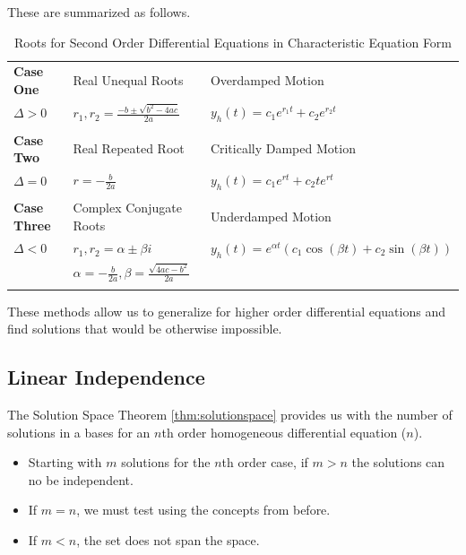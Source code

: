     These are summarized as follows.

        \begin{table}[ht]
            \centering
            \begin{tabular}{| l | l | l |}
                \hline
                \textbf{Case One} & Real Unequal Roots & Overdamped Motion\\
                $\Delta > 0$ & $r_1, r_2 = \frac{-b \pm \sqrt{b^2 - 4ac}}{2a}$ & $y_h(t) = c_1 e^{r_1 t} + c_2 e^{r_2 t}$\\&&\\
                \hline
                \textbf{Case Two} & Real Repeated Root & Critically Damped Motion\\
                $\Delta = 0$ & $r = - \frac{b}{2a} $ & $y_h(t) = c_1 e^{r t} + c_2 t e^{r t}$\\&&\\
                \hline
                \textbf{Case Three} & Complex Conjugate Roots & Underdamped Motion\\
                $\Delta < 0$ & $r_1, r_2 = \alpha \pm \beta i$ & $y_h(t) = e^{\alpha t} \left( c_1 \cos \left(\beta t \right) + c_2 \sin \left( \beta t \right) \right)$\\
                & $\alpha = - \frac{b}{2a}, \beta = \frac{\sqrt{4ac - b^2}}{2a}$ &\\&&\\
                \hline
            \end{tabular}
            \caption{Roots for Second Order Differential Equations in Characteristic Equation Form}
            \label{table:roots}
        \end{table}

    These methods allow us to generalize for higher order differential equations and find solutions that would be otherwise impossible.

    \subsection{Linear Independence}
    The Solution Space Theorem \eqref{thm:solutionspace} provides us with the number of solutions in a bases for an $n$th order homogeneous differential equation ($n$).

    \begin{itemize}
        \item Starting with $m$ solutions for the $n$th order case, if $m > n$ the solutions can no be independent.
        \item If $m=n$, we must test using the concepts from before.
        \item If $m < n$, the set does not span the space.
    \end{itemize}

